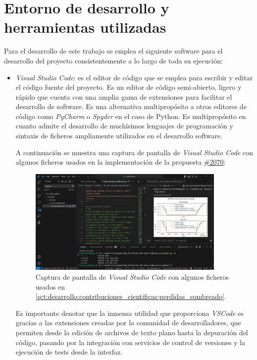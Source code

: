 \section{Entorno de desarrollo y herramientas utilizadas} \label{sct:desarrollo:entorno}

Para el desarrollo de este trabajo se emplea el siguiente \gls{software} para el desarrollo del proyecto consistentemente a lo largo de toda su ejecución:

\begin{itemize}
    \item \textit{Visual Studio Code}: es el editor de código que se emplea para escribir y editar el código fuente del proyecto. Es un editor de código semi-abierto, ligero y rápido que cuenta con una amplia gama de extensiones para facilitar el desarrollo de software. Es una alternativa multipropósito a otros editores de código como \textit{PyCharm} o \textit{Spyder} en el caso de \gls{Python}. Es multipropósito en cuanto admite el desarrollo de muchísimos lenguajes de programación y sintaxis de ficheros ampliamente utilizados en el desarrollo software.

          A continuación se muestra una captura de pantalla de \textit{Visual Studio Code} con algunos ficheros usados en la implementación de la propuesta \href{https://github.com/pvlib/pvlib-python/pull/2070}{\#2070}:

          \begin{figure}[H]
              \centering
              \includegraphics[width=0.9\textwidth]{./images/SoA_foss/VSCode.png}
              \caption{Captura de pantalla de \textit{Visual Studio Code} con algunos ficheros usados en \ref{sct:desarrollo:contribuciones_cientificas:perdidas_sombreado}.}
              \label{fig:vscode}
          \end{figure}

          Es importante denotar que la inmensa utilidad que proporciona \textit{VSCode} es gracias a las extensiones creadas por la comunidad de desarrolladores, que permiten desde la edición de archivos de texto plano hasta la depuración del código, pasando por la integración con servicios de control de versiones y la ejecución de tests desde la interfaz.


\end{itemize}
